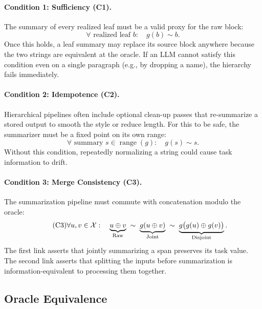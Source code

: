 \paragraph{Condition 1: Sufficiency (C1).} The summary of every realized leaf must be a valid proxy for the raw block:
\begin{equation}\tag{C1}\label{eq:leaf_sufficiency}
\forall \text{ realized leaf } b:\quad g(b) \sim b.
\end{equation}
Once this holds, a leaf summary may replace its source block anywhere because the two strings are equivalent at the oracle. If an LLM cannot satisfy this condition even on a single paragraph (e.g., by dropping a name), the hierarchy fails immediately.

\paragraph{Condition 2: Idempotence (C2).} Hierarchical pipelines often include optional clean-up passes that re-summarize a stored output to smooth the style or reduce length. For this to be safe, the summarizer must be a fixed point on its own range:
\begin{equation}\tag{C2}\label{eq:leaf_idempotence}
\forall \text{ summary } s \in \operatorname{range}(g):\quad g(s) \sim s.
\end{equation}
Without this condition, repeatedly normalizing a string could cause task information to drift.

\paragraph{Condition 3: Merge Consistency (C3).} The summarization pipeline must commute with concatenation modulo the oracle:
\begin{equation}\tag{C3}\label{eq:leaf_compatibility}
\forall u, v \in \mathcal{X}:\quad
\underbrace{u \oplus v}_{\text{Raw}} \;\sim\;
\underbrace{g(u \oplus v)}_{\text{Joint}} \;\sim\;
\underbrace{g\big(g(u) \oplus g(v)\big)}_{\text{Disjoint}}.
\end{equation}
The first link asserts that jointly summarizing a span preserves its task value. The second link asserts that splitting the inputs before summarization is information-equivalent to processing them together.

\subsection{Oracle Equivalence}

